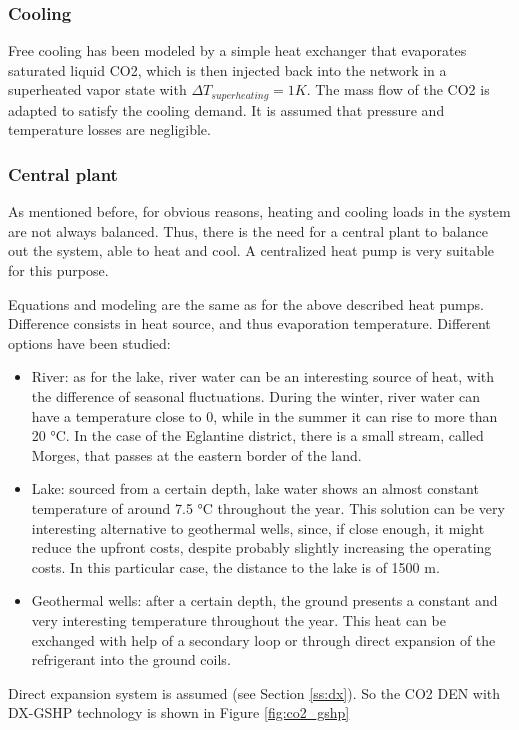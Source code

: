 \documentclass{article}
\begin{document}
\subsubsection{Cooling}
Free cooling has been modeled by a simple heat exchanger that evaporates saturated liquid CO2, which is then injected back into the network in a superheated vapor state with $\Delta T_{superheating} = 1K$. The mass flow of the CO2 is adapted to satisfy the cooling demand. It is assumed that pressure and temperature losses are negligible.

\subsubsection{Central plant}
As mentioned before, for obvious reasons, heating and cooling loads in the system are not always balanced. Thus, there is the need for a central plant to balance out the system, able to heat and cool. A centralized heat pump is very suitable for this purpose.

Equations and modeling are the same as for the above described heat pumps. Difference consists in heat source, and thus evaporation temperature. Different options have been studied:
\begin{itemize}
    \item River: as for the lake, river water can be an interesting source of heat, with the difference of seasonal fluctuations. During the winter, river water can have a temperature close to 0, while in the summer it can rise to more than 20 \si{\celsius}. In the case of the Eglantine district, there is a small stream, called Morges, that passes at the eastern border of the land.
    \item Lake: sourced from a certain depth, lake water shows an almost constant temperature of around 7.5 \si{\celsius} throughout the year. This solution can be very interesting alternative to geothermal wells, since, if close enough, it might reduce the upfront costs, despite probably slightly increasing the operating costs. In this particular case, the distance to the lake is of 1500 m.
    \item Geothermal wells: after a certain depth, the ground presents a constant and very interesting temperature throughout the year. This heat can be exchanged with help of a secondary loop or through direct expansion of the refrigerant into the ground coils.
\end{itemize}

Direct expansion system is assumed (see Section \ref{ss:dx}).
So the CO2 DEN with DX-GSHP technology is shown in Figure \ref{fig:co2_gshp}
\end{document}
